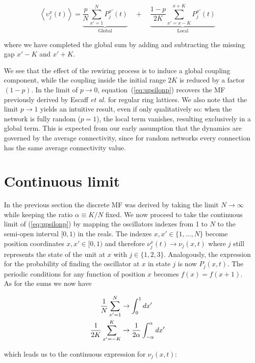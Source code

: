 \begin{equation}
  \left< \upsilon_j^x(t) \right> = \underbrace{\frac{p}{N}\sum_{x'=1}^N P_j^{x'}(t)}_{\text{Global}}
  \quad + \quad \underbrace{\frac{1-p}{2K}\sum_{x'=x-K}^{x+K} P_j^{x'}(t)}_{\text{Local}}
  \label{eq:upsilonp}
\end{equation}

\noindent where we have completed the global sum by adding and subtracting the missing gap $x'-K$ and $x'+K$.

We see that the effect of the rewiring process is to induce a global coupling component, while the coupling inside the initial range
$2K$ is reduced by a factor $(1-p)$. In the limit of $p\to 0$, equation~(\ref{eq:upsilonp}) recovers the MF previously derived by
Escaff \textit{et al.} for regular ring lattices\cite{escaff2014arrays}. We also note that the limit $p\to 1$ yields an intuitive
result, even if only qualitatively so: when the network is fully random ($p=1$), the local term vanishes, resulting exclusively in a
global term. This is expected from our early assumption that the dynamics are governed by the average connectivity, since for random
networks every connection has the same average connectivity value.

\section{Continuous limit}

In the previous section the discrete MF was derived by taking the limit $N\to\infty$ while keeping the ratio $\alpha\equiv K/N$ fixed.
We now proceed to take the continuous limit of (\ref{eq:upsilonp}) by mapping the oscillators indexes from 1 to $N$ to the semi-open
interval $[0,1)$ in the reals. The indexes $x,x' \in \{1,...,N\}$ become position coordinates $x,x'\in [0,1)$ and therefore $\nu^x_j(t)
\to \nu_j(x,t)$ where $j$ still represents the state of the unit at $x$ with $j\in\{1,2,3\}$. Analogously, the expression for the
probability of finding the oscillator at $x$ in state $j$ is now $P_j(x,t)$. The periodic conditions for any function of position $x$
becomes $f(x)=f(x+1)$. As for the sums we now have

\begin{align}
  \frac{1}{N}\sum_{x'=1}^N &\to \int_{0}^{1} dx' \notag\\
  \frac{1}{2K}\sum_{x'=-K}^K &\to \frac{1}{2\alpha}\int_{-\alpha}^{\alpha} dx'
\end{align}

\noindent which leads us to the continuous expression for $\nu_j(x,t)$:

